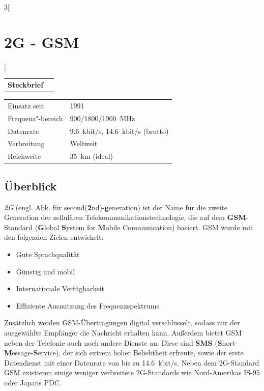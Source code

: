 \begin{multicols}{3}[\section{2G - GSM}]

\newrefsegment

\begin{tabular}{p{}p{2.7 cm}}
\textbf{Steckbrief}& \\
\end{tabular}
\begin{tabular}{p{}p{2.7 cm}}
      Einsatz seit & 1991\\
      Frequenz"-bereich  & 900/1800/\SI{1900}{\mega\hertz}\\
      Datenrate & \SI{9,6}{kbit/s}, \SI{14,6}{kbit/s} (brutto) \\
      Verbreitung & Weltweit\\
      Reichweite & \SI{35}{\kilo\metre} (ideal)\\
\end{tabular}
\par
\subsection*{Überblick}
\textit{2G} (engl. Abk. für second(\textbf{2}nd)-\textbf{g}eneration) ist der Name für die zweite Generation der zellulären Telekommunikationstechnologie, die auf dem \textbf{GSM}-Standard (\textbf{G}lobal \textbf{S}ystem for \textbf{M}obile Communication) basiert. 
GSM wurde mit den folgenden Zielen entwickelt: 
\begin{itemize}
	\item Gute Sprachqualität
	\item Günstig und mobil
	\item Internationale Verfügbarkeit
	\item Effiziente Ausnutzung des Frequenzspektrums
\end{itemize}
Zusätzlich werden GSM-Übertragungen digital verschlüsselt, sodass nur der ausgewählte Empfänger die Nachricht erhalten kann. Außerdem bietet GSM neben der Telefonie auch noch andere Dienste an. Diese sind \textbf{SMS} (\textbf{S}hort-\textbf{M}essage-\textbf{S}ervice), der sich extrem hoher Beliebtheit erfreute, sowie der erste Datendienst mit einer Datenrate von bis zu \SI{14.6}{kbit/s}.
Neben dem 2G-Standard GSM existieren einige weniger verbreitete 2G-Standards wie Nord-Amerikas IS-95 oder Japans PDC.
\cite{G2.1}

\end{multicols}
